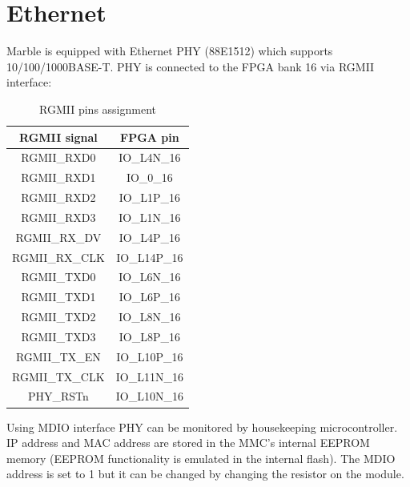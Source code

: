 \documentclass[12pt,oneside,a4]{article}
\begin{document}
\section{Ethernet}
Marble is equipped with Ethernet PHY (88E1512) which supports 10/100/1000BASE-T. PHY is connected to the FPGA bank 16 via RGMII interface:

\begin{table}[htbp]
\centering
\begin{tabular}{@{}cc@{}}
\toprule
\textbf{RGMII signal}              & \textbf{FPGA pin}                \\ \midrule
RGMII\_RXD0                        & IO\_L4N\_16                      \\
RGMII\_RXD1                        & IO\_0\_16                        \\
RGMII\_RXD2                        & IO\_L1P\_16                      \\
RGMII\_RXD3                        & IO\_L1N\_16                      \\
RGMII\_RX\_DV                      & IO\_L4P\_16                      \\
RGMII\_RX\_CLK                     & IO\_L14P\_16                     \\
RGMII\_TXD0                        & IO\_L6N\_16                      \\
RGMII\_TXD1                        & IO\_L6P\_16                      \\
RGMII\_TXD2                        & IO\_L8N\_16                      \\
RGMII\_TXD3                        & IO\_L8P\_16                      \\
RGMII\_TX\_EN                      & IO\_L10P\_16                     \\
\multicolumn{1}{l}{RGMII\_TX\_CLK} & \multicolumn{1}{l}{IO\_L11N\_16} \\
PHY\_RSTn                          & IO\_L10N\_16                     \\ \bottomrule
\end{tabular}
\caption{RGMII pins assignment}
\label{tab:rgmii}
\end{table}
Using MDIO interface PHY can be monitored by housekeeping microcontroller. IP address and MAC address are stored in the MMC's internal EEPROM memory (EEPROM functionality is emulated in the internal flash).
The MDIO address is set to 1 but it can be changed by changing the resistor on the module.
\end{document}
